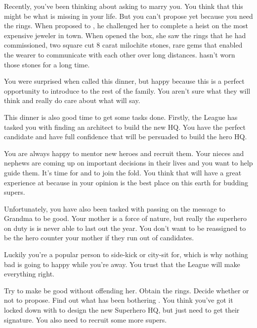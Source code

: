\documentclass[char]{LRSguildcamp1}
\begin{document}
Recently, you've been thinking about asking \cYS{} to marry you. You think that this might be what is missing in your life. But you can't propose yet because you need the rings. When \cGS{} proposed to \cGrandma{}, he challenged her to complete a heist on the most expensive jeweler in town. When \cGrandma{} opened the box, she saw the rings that he had commissioned, two square cut 8 carat milochite stones, rare gems that enabled the wearer to communicate with each other over long distances.  \cGrandma{} hasn't worn those stones for a long time. 

You were surprised when \cGrandma{} called this dinner, but happy because this is a perfect opportunity to introduce \cYS{} to the rest of the family. You aren't sure what they will think and really do care about what \cGrandma{} will say. 

This dinner is also good time to get some tasks done. Firstly, the League has tasked you with finding an architect to build the new HQ. You have the perfect candidate and have full confidence that \cArchitect{} will be persuaded to build the hero HQ. 

You are always happy to mentor new heroes and recruit them. Your nieces and nephews are coming up on important decisions in their lives and you want to help guide them. It's time for \cGrad{} and \cTeen{} to join the fold. You think that \cTween{} will have a great experience at \pSuperSchool{} because in your opinion \pSuperSchool{} is the best place on this earth for budding supers. 

Unfortunately, you have also been tasked with passing on the message to Grandma to be good. Your mother is a force of nature, but really the superhero on duty is \pCityGrandma{} is never able to last out the year. You don't want to be reassigned to be the hero counter your mother if they run out of candidates. 

Luckily you're a popular person to side-kick or city-sit for, which is why nothing bad is going to happy while you're away. You trust that the League will make everything right.  


\begin{itemz}[Goals]
	\item 
	Try to make \cGrandma{} be good without offending her. 
	Obtain the rings.
	Decide whether or not to propose. 
	Find out what has been bothering \cYS{}. 
	You think you’ve got it locked down with \cArchitect{} to design the new Superhero HQ, but just need to get their signature. 
	You also need to recruit some more supers. 
	
\end{itemz}
\end{document}
